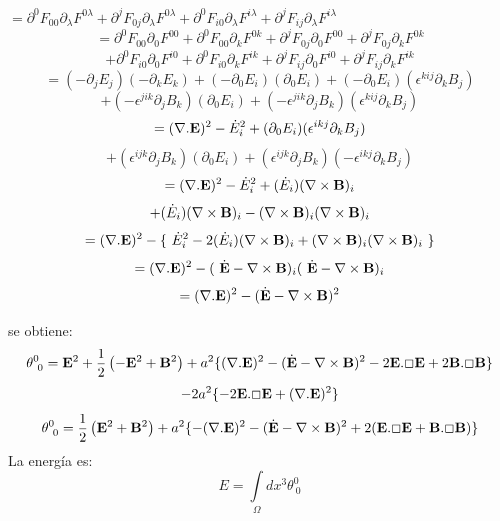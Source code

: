 \documentclass[a4paper,12pt]{article}
\begin{document}
\begin{enumerate}
$=\partial^0 F_{00}\partial_\lambda F^{0\lambda}+\partial^j F_{0j}\partial_\lambda F^{0\lambda}+\partial^0 F_{i0}\partial_\lambda 
F^{i\lambda}+\partial^j F_{ij}\partial_\lambda F^{i\lambda}$
$$=\partial^0 F_{00}\partial_0 F^{00}+\partial^0 F_{00}\partial_k F^{0k}+\partial^j F_{0j}\partial_0 F^{00}+\partial^j F_{0j}\partial_k F^{0k}$$ 
$$+\partial^0 F_{i0}\partial_0 F^{i0}+\partial^0 F_{i0}\partial_k F^{ik}+\partial^j F_{ij}\partial_0 F^{i0}+\partial^j F_{ij}\partial_k F^{ik}$$
$$=(-\partial_jE_j)(-\partial_kE_k)+(-\partial_0 E_i)(\partial_0 E_i)+(-\partial_0 E_i)(\epsilon^{kij}\partial_kB_j)$$
$$+(-\epsilon^{jik}\partial_jB_k)(\partial_0 E_i)+(-\epsilon^{jik}\partial_jB_k)(\epsilon^{kij}\partial_kB_j)$$
$$=({\nabla.\bf E})^2-\dot E_i^2+(\partial_0 E_i)(\epsilon^{ikj}\partial_kB_j)$$
$$+(\epsilon^{ijk}\partial_jB_k)(\partial_0 E_i)+(\epsilon^{ijk}\partial_jB_k)(-\epsilon^{ikj}\partial_kB_j)$$
$$=({\nabla.\bf E})^2-\dot E_i^2+(\dot E_i)(\nabla \times {\bf B})_i$$
$$+(\dot E_i)(\nabla \times {\bf B})_i-(\nabla \times {\bf B})_i(\nabla \times {\bf B})_i$$
$$=({\nabla.\bf E})^2-\{\ \dot E_i^2-2(\dot E_i)(\nabla \times {\bf B})_i+(\nabla \times {\bf B})_i(\nabla \times {\bf B})_i\ \}$$
$$=({\nabla.\bf E})^2-(\ \dot {\bf E}-\nabla \times {\bf B})_i(\ \dot {\bf E}-\nabla \times {\bf B})_i$$
$$=({\nabla.\bf E})^2-( \dot {\bf E}-\nabla \times {\bf B})^2$$
\end{enumerate}
se obtiene:
\begin{equation}
\theta^0_{\ 0}= {\bf E}^2+\frac{1}{2}\left(-{\bf E}^2+{\bf B}^2 \right)+a^2\{({\nabla.\bf E})^2-( \dot {\bf E}-\nabla \times {\bf B})^2-2{\bf E}.\Box{\bf E}+2{\bf B}.\Box{\bf B}\}
\end{equation}
$$-2a^2\{-2{\bf E}.\Box {\bf E}+({\nabla.\bf E})^2\}$$
\begin{equation}
\theta^0_{\ 0}=\frac{1}{2}\left({\bf E}^2+{\bf B}^2 \right)+a^2\{-({\nabla.\bf E})^2-( \dot {\bf E}-\nabla \times {\bf B})^2+2({\bf E}.\Box{\bf E}+{\bf B}.\Box{\bf B})\}
\end{equation}
La energía es:
\begin{equation}
E=\int\limits_{\Omega}dx^{3}\theta^{0}_{\ 0}
\end{equation}

\vspace{0,4cm}

\\
\end{document}
